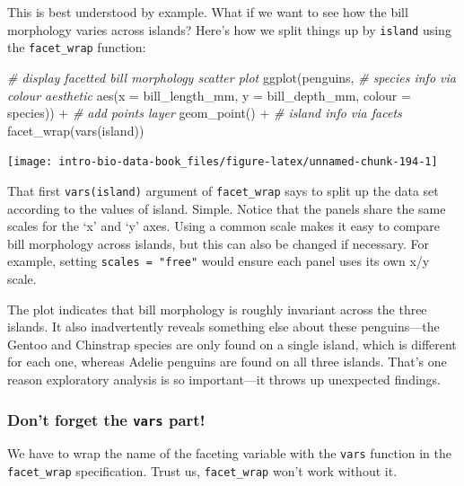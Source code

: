 \documentclass[
]{book}
\newenvironment{Shaded}{\begin{snugshade}}{\end{snugshade}}
\newcommand{\AttributeTok}[1]{\textcolor[rgb]{0.77,0.63,0.00}{#1}}
\newcommand{\CommentTok}[1]{\textcolor[rgb]{0.56,0.35,0.01}{\textit{#1}}}
\newcommand{\FunctionTok}[1]{\textcolor[rgb]{0.00,0.00,0.00}{#1}}
\newcommand{\NormalTok}[1]{#1}
\newcommand{\SpecialCharTok}[1]{\textcolor[rgb]{0.00,0.00,0.00}{#1}}
\newenvironment{greybox}{
  \definecolor{shadecolor}{rgb}{0.95,0.95,0.95}  %
  \color{black}
  \begin{shaded}}
 {\end{shaded}}
\newenvironment{infobox}[1]
  {
  \begin{itemize}
  \renewcommand{\labelitemi}{
    \raisebox{-.7\height}[0pt][0pt]{
      {\setkeys{Gin}{width=3em,keepaspectratio}
        \texttt{[image: images/\#1]}}
    }
  }
  \setlength{\fboxsep}{1em}
  \begin{greybox}
  \item
  }
  {
  \end{greybox}
  \end{itemize}
  }
\begin{document}
This is best understood by example. What if we want to see how the bill morphology varies across islands? Here's how we split things up by \texttt{island} using the \texttt{facet\_wrap} function:

\begin{Shaded}
\begin{Highlighting}[]
\CommentTok{\# display facetted bill morphology scatter plot}
\FunctionTok{ggplot}\NormalTok{(penguins, }
       \CommentTok{\# species info via colour aesthetic}
       \FunctionTok{aes}\NormalTok{(}\AttributeTok{x =}\NormalTok{ bill\_length\_mm, }\AttributeTok{y =}\NormalTok{ bill\_depth\_mm, }\AttributeTok{colour =}\NormalTok{ species)) }\SpecialCharTok{+} 
  \CommentTok{\# add points layer}
  \FunctionTok{geom\_point}\NormalTok{() }\SpecialCharTok{+} 
  \CommentTok{\# island info via facets}
  \FunctionTok{facet\_wrap}\NormalTok{(}\FunctionTok{vars}\NormalTok{(island))}
\end{Highlighting}
\end{Shaded}

\begin{center}\texttt{[image: intro-bio-data-book\_files/figure-latex/unnamed-chunk-194-1]} \end{center}

That first \texttt{vars(island)} argument of \texttt{facet\_wrap} says to split up the data set according to the values of island. Simple. Notice that the panels share the same scales for the `x' and `y' axes. Using a common scale makes it easy to compare bill morphology across islands, but this can also be changed if necessary. For example, setting \texttt{scales\ =\ "free"} would ensure each panel uses its own x/y scale.

The plot indicates that bill morphology is roughly invariant across the three islands. It also inadvertently reveals something else about these penguins---the Gentoo and Chinstrap species are only found on a single island, which is different for each one, whereas Adelie penguins are found on all three islands. That's one reason exploratory analysis is so important---it throws up unexpected findings.

\begin{infobox}{warning}

\hypertarget{dont-forget-the-vars-part}{%
\subsubsection*{\texorpdfstring{Don't forget the \texttt{vars} part!}{Don't forget the vars part!}}\label{dont-forget-the-vars-part}}

We have to wrap the name of the faceting variable with the \texttt{vars} function in the \texttt{facet\_wrap} specification. Trust us, \texttt{facet\_wrap} won't work without it.

\end{infobox}
\end{document}
